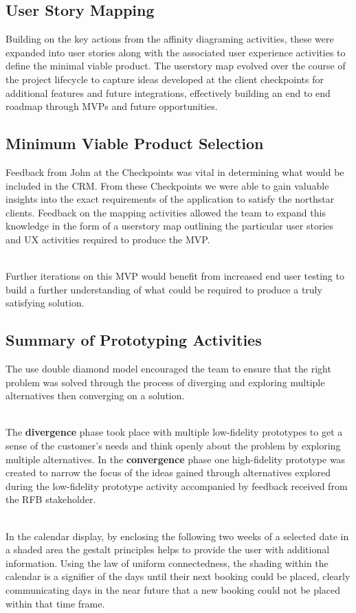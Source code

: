 \documentclass[english,course]{lecture}
\begin{document}
\subsection{User Story Mapping}
Building on the key actions from the affinity diagraming activities, these were expanded into user stories along with the associated user experience activities to define the minimal viable product. The userstory map evolved over the course of the project lifecycle to capture ideas developed at the client checkpoints for additional features and future integrations, effectively building an end to end roadmap through MVPs and future opportunities.

\subsection{Minimum Viable Product Selection}
Feedback from John at the Checkpoints was vital in determining what would be included in the CRM. From these Checkpoints we were able to gain valuable insights into the exact requirements of the application to satisfy the northstar clients. Feedback on the mapping activities allowed the team to expand this knowledge in the form of a userstory map outlining the particular user stories and UX activities required to produce the MVP.

\\Further iterations on this MVP would benefit from increased end user testing to build a further understanding of what could be required to produce a truly satisfying solution.

\subsection{Summary of Prototyping Activities}
The use double diamond model encouraged the team to ensure that the right problem was solved through the process of diverging and exploring multiple alternatives then converging on a solution.

\\The \textbf{divergence} phase took place with multiple low-fidelity prototypes to get a sense of the customer's needs and think openly about the problem by exploring multiple alternatives. In the \textbf{convergence} phase one high-fidelity prototype was created to narrow the focus of the ideas gained through alternatives explored during the low-fidelity prototype activity accompanied by feedback received from the RFB stakeholder.

\\In the calendar display, by enclosing the following two weeks of a selected date in a shaded area the gestalt principles helps to provide the user with additional information. Using the law of uniform connectedness, the shading within the calendar is a signifier of the days until their next booking could be placed, clearly communicating days in the near future that a new booking could not be placed within that time frame.
\end{document}
